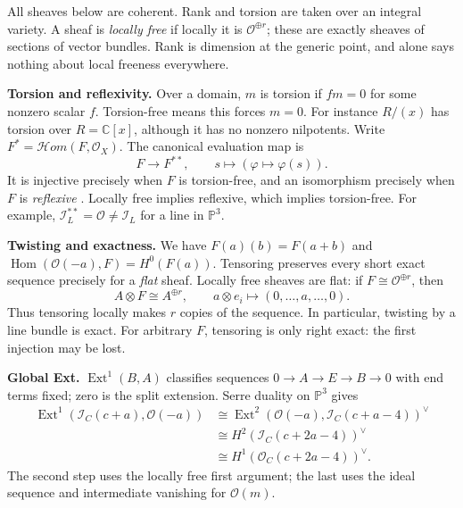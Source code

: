\documentclass[11pt,a4paper]{article}
\begin{document}
All sheaves below are coherent.
Rank and torsion are taken over an
integral variety. A sheaf is
\emph{locally free} if locally it is
$\mathcal{O}^{\oplus r}$; these are
exactly sheaves of sections of vector
bundles. Rank is dimension at the
generic point, and alone says nothing
about local freeness everywhere.

\textbf{Torsion and reflexivity.}
Over a domain, $m$ is torsion if
$fm=0$ for some nonzero scalar $f$.
Torsion-free means this forces $m=0$.
For instance $R/(x)$ has torsion over
$R=\mathbb{C}[x]$, although it has no
nonzero nilpotents.
Write $F^*=\mathcal{H}om(F,\mathcal{O}_X)$.
The canonical evaluation map is
$$
F\longrightarrow F^{**},\qquad
s\longmapsto(\varphi\mapsto\varphi(s)).
$$
It is injective precisely when $F$ is
torsion-free, and an isomorphism
precisely when $F$ is \emph{reflexive}
\cite{stacks}.
Locally free implies reflexive, which
implies torsion-free. For example,
$\mathcal{I}_L^{**}=\mathcal{O}\ne
\mathcal{I}_L$ for a line in
$\mathbb{P}^3$.

\textbf{Twisting and exactness.}
We have $F(a)(b)=F(a+b)$ and
$\operatorname{Hom}(\mathcal{O}(-a),F)
=H^0(F(a))$.
Tensoring preserves every short exact
sequence precisely for a \emph{flat}
sheaf. Locally free sheaves are flat:
if $F\cong\mathcal{O}^{\oplus r}$, then
$$
A\otimes F\cong A^{\oplus r},\qquad
a\otimes e_i\longmapsto
(0,\ldots,a,\ldots,0).
$$
Thus tensoring locally makes $r$ copies
of the sequence. In particular, twisting
by a line bundle is exact.
For arbitrary $F$, tensoring is only
right exact: the first injection may
be lost.

\textbf{Global Ext.}
$\operatorname{Ext}^1(B,A)$ classifies
sequences $0\to A\to E\to B\to0$
with end terms fixed; zero is the split
extension. Serre duality on
$\mathbb{P}^3$ gives
$$
\begin{aligned}
\operatorname{Ext}^1
(\mathcal{I}_C(c+a),\mathcal{O}(-a))
&\cong\operatorname{Ext}^2
(\mathcal{O}(-a),\mathcal{I}_C(c+a-4))^\vee\\
&\cong H^2(\mathcal{I}_C(c+2a-4))^\vee\\
&\cong H^1(\mathcal{O}_C(c+2a-4))^\vee.
\end{aligned}
$$
The second step uses the locally free
first argument; the last uses the ideal
sequence and intermediate vanishing
for $\mathcal{O}(m)$.
\end{document}
